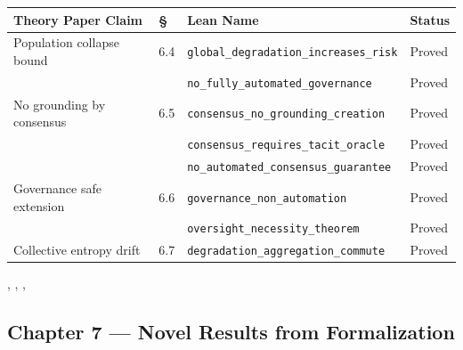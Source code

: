 \begin{center}
\begin{tabular}{p{5.2cm}lp{5.2cm}l}
\toprule
Theory Paper Claim & \S & Lean Name & Status \\
\midrule
Population collapse bound
  & 6.4 & \texttt{global\_degradation\_increases\_risk} & Proved \\
  &     & \texttt{no\_fully\_automated\_governance}     & Proved \\
No grounding by consensus
  & 6.5 & \texttt{consensus\_no\_grounding\_creation}   & Proved \\
  &     & \texttt{consensus\_requires\_tacit\_oracle}   & Proved \\
  &     & \texttt{no\_automated\_consensus\_guarantee}  & Proved \\
Governance safe extension
  & 6.6 & \texttt{governance\_non\_automation}          & Proved \\
  &     & \texttt{oversight\_necessity\_theorem}        & Proved \\
Collective entropy drift
  & 6.7 & \texttt{degradation\_aggregation\_commute}    & Proved \\
\bottomrule
\end{tabular}
\end{center}

\noindent{}, ,
, 

\subsection*{Chapter 7 — Novel Results from Formalization}

